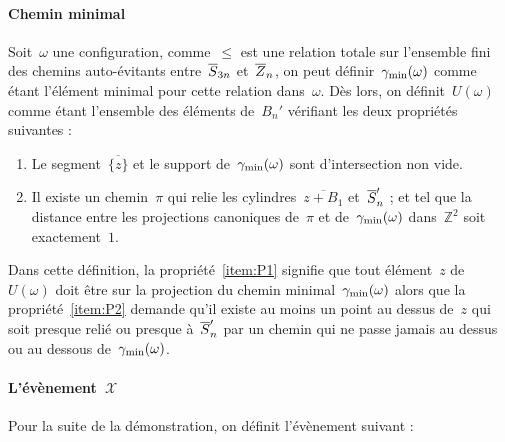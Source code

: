 		\paragraph{Chemin minimal}
			Soit~$\omega$ une configuration, comme~$\leq$ est une relation totale sur l'ensemble fini des chemins auto-évitants entre~$\SnB$ et~$\ZnB$, on peut définir~$\Cmin$ \marginnote{$\Cmin$} comme étant l'élément minimal pour cette relation dans~$\omega$. Dès lors, on définit~$U(\omega)$ comme étant l'ensemble des éléments de~$B_n'$ vérifiant les deux propriétés suivantes :
			\begin{enumerate}[label=\textbf{P\arabic*}., ref=P\arabic*]
				\item\label{item:P1} Le segment~$\overline{\{z\}}$ et le support de~$\Cmin$ sont d'intersection non vide.
				\item\label{item:P2} Il existe un chemin~$\pi$ qui relie les cylindres~$\overline{z+B_1}$ et~$\SnB[n]'$ ; et tel que la distance entre les projections canoniques de~$\pi$ et de~$\Cmin$ dans~$\mathbb{Z}^2$ soit exactement~$1$.
			\end{enumerate}
			Dans cette définition, la propriété~\ref{item:P1} signifie que tout élément~$z$ de~$U(\omega)$ doit être sur la projection du chemin minimal~$\Cmin$ alors que la propriété~\ref{item:P2} demande qu'il existe au moins un point au dessus de~$z$ qui soit presque relié ou presque à~$\SnB[n]'$ par un chemin qui ne passe jamais au dessus ou au dessous de~$\Cmin$.
		
		\boldmath
		\paragraph{L'évènement~$\mathcal{X}$}
		\unboldmath
		Pour la suite de la démonstration, on définit l'évènement suivant :
		
